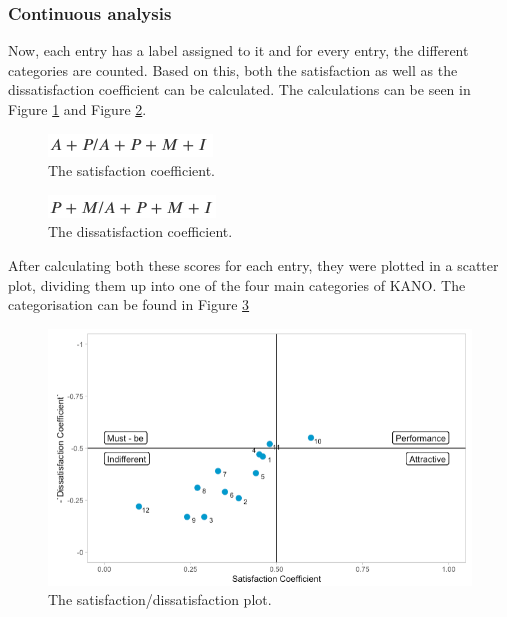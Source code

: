 \subsubsection{Continuous analysis}
Now, each entry has a label assigned to it and for every entry, the different categories are counted. Based on this, both the satisfaction as well as the dissatisfaction coefficient can be calculated. The calculations can be seen in Figure \ref{fig:satisfactionCoef} and Figure \ref{fig:dissatisfactionCoef}.
\begin{figure}[!htb]
	\centering
	\includegraphics{../LaTeX/Figures/Kano/SatisfactionCoef.png}
	\caption{The satisfaction coefficient.}
	\label{fig:satisfactionCoef}
\end{figure}
\begin{figure}[!htb]
	\centering
	\includegraphics{../LaTeX/Figures/Kano/DissatisfactionCoef.png}
	\caption{The dissatisfaction coefficient.}
	\label{fig:dissatisfactionCoef}
\end{figure}
\break
After calculating both these scores for each entry, they were plotted in  a scatter plot, dividing them up into one of the four main categories of KANO. The categorisation can be found in Figure \ref{fig:satisfactionPlot}
\begin{figure}[!htb]
	\centering
	\includegraphics[width=\linewidth]{../LaTeX/Figures/Kano/SatisfactionPlot.png}
	\caption{The satisfaction/dissatisfaction plot.}
	\label{fig:satisfactionPlot}
\end{figure}

